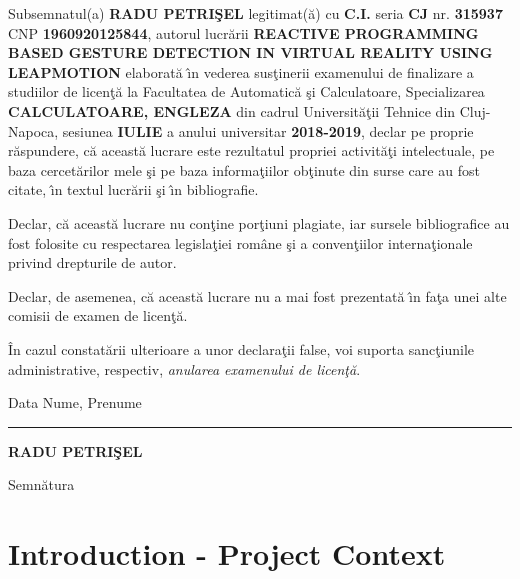 \documentclass[12pt,a4paper,twoside]{report}
\renewcommand{\thesistitle}{REACTIVE PROGRAMMING BASED GESTURE DETECTION IN VIRTUAL REALITY USING LEAPMOTION}
\newcommand{\uline}[1]{\rule[0pt]{#1}{0.4pt}}
\begin{document}
Subsemnatul(a) \textbf{RADU PETRI\c{S}EL} legitimat(\u{a}) cu \textbf{C.I.} seria \textbf{CJ} nr. \textbf{315937} CNP \textbf{1960920125844}, autorul lucr\u{a}rii \textbf{\thesistitle{}} elaborat\u{a} \^{\i}n vederea sus\c{t}inerii examenului de finalizare a studiilor de licen\c{t}\u{a} la Facultatea de Automatic\u{a} \c{s}i Calculatoare, Specializarea \textbf{CALCULATOARE, ENGLEZA} din cadrul Universit\u{a}\c{t}ii Tehnice din Cluj-Napoca, sesiunea \textbf{IULIE} a anului universitar \textbf{2018-2019}, declar pe proprie r\u{a}spundere, c\u{a} aceast\u{a} lucrare este rezultatul propriei activit\u{a}\c{t}i intelectuale, pe baza cercet\u{a}rilor mele \c{s}i pe baza informa\c{t}iilor ob\c{t}inute din surse care au fost citate, \^{\i}n textul lucr\u{a}rii \c{s}i \^{\i}n bibliografie.

Declar, c\u{a} aceast\u{a} lucrare nu con\c{t}ine por\c{t}iuni plagiate, iar sursele bibliografice au fost folosite cu 
respectarea legisla\c{t}iei rom\^{a}ne \c{s}i a conven\c{t}iilor interna\c{t}ionale privind drepturile de autor.

Declar, de asemenea, c\u{a} aceast\u{a} lucrare nu a mai fost prezentat\u{a} \^{\i}n fa\c{t}a unei alte comisii de examen de licen\c{t}\u{a}.

\^{I}n cazul constat\u{a}rii ulterioare a unor declara\c{t}ii false, voi suporta sanc\c{t}iunile administrative, respectiv, \emph{anularea examenului de licen\c{t}\u{a}}.

\vspace{1.5cm}

Data \hspace{8cm} Nume, Prenume

\vspace{0.5cm}

\uline{3cm} \hspace{5cm} \textbf{RADU PETRI\c{S}EL}

\vspace{0.5cm}
\hspace{9.4cm}Semn\u{a}tura

\thispagestyle{empty}

\newpage

\tableofcontents
\newpage

\setcounter{page}{1}


\chapter{Introduction - Project Context}
\pagestyle{headings}
\end{document}
